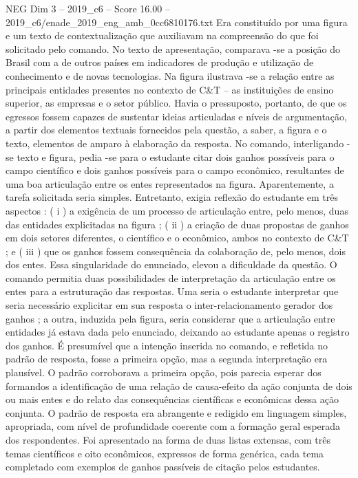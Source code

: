 \begin{textsample}{NEG Dim 3 – 2019\_c6 – Score 16.00 – 2019\_c6/enade\_2019\_eng\_amb\_0cc6810176.txt}
Era constituído por uma figura e um texto de contextualização que auxiliavam na compreensão do que foi solicitado pelo comando.
No texto de apresentação, comparava -se a posição do Brasil com a de outros países em indicadores de produção e utilização de conhecimento e de novas tecnologias.
Na figura ilustrava -se a relação entre as principais entidades presentes no contexto de C\&T – as instituições de ensino superior, as empresas e o setor público.
Havia o pressuposto, portanto, de que os egressos fossem capazes de sustentar ideias articuladas e níveis de argumentação, a partir dos elementos textuais fornecidos pela questão, a saber, a figura e o texto, elementos de amparo à elaboração da resposta.
No comando, interligando -se texto e figura, pedia -se para o estudante citar dois ganhos possíveis para o campo científico e dois ganhos possíveis para o campo econômico, resultantes de uma boa articulação entre os entes representados na figura.
Aparentemente, a tarefa solicitada seria simples.
Entretanto, exigia reflexão do estudante em três aspectos : ( i ) a exigência de um processo de articulação entre, pelo menos, duas das entidades explicitadas na figura ; ( ii ) a criação de duas propostas de ganhos em dois setores diferentes, o científico e o econômico, ambos no contexto de C\&T ; e ( iii ) que os ganhos fossem consequência da colaboração de, pelo menos, dois dos entes.
Essa singularidade do enunciado, elevou a dificuldade da questão.
O comando permitia duas possibilidades de interpretação da articulação entre os entes para a estruturação das respostas.
Uma seria o estudante interpretar que seria necessário explicitar em sua resposta o inter-relacionamento gerador dos ganhos ; a outra, induzida pela figura, seria considerar que a articulação entre entidades já estava dada pelo enunciado, deixando ao estudante apenas o registro dos ganhos.
É presumível que a intenção inserida no comando, e refletida no padrão de resposta, fosse a primeira opção, mas a segunda interpretação era plausível.
O padrão corroborava a primeira opção, pois parecia esperar dos formandos a identificação de uma relação de causa-efeito da ação conjunta de dois ou mais entes e do relato das consequências científicas e econômicas dessa ação conjunta.
O padrão de resposta era abrangente e redigido em linguagem simples, apropriada, com nível de profundidade coerente com a formação geral esperada dos respondentes.
Foi apresentado na forma de duas listas extensas, com três temas científicos e oito econômicos, expressos de forma genérica, cada tema completado com exemplos de ganhos passíveis de citação pelos estudantes.

\end{textsample}
